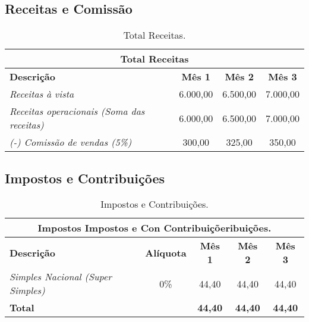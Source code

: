        
        
        \subsection{Receitas e Comissão}
		
		\begin{table}[htbp]
			\centering
			\caption{Total Receitas.}
			
			
			\begin{tabularx}{\linewidth}{|X|c|c|c|}
				\toprule
				\multicolumn{4}{c}{\cellcolor{gray!50}\textbf{Total Receitas}} \\
				\midrule
				\textbf{Descrição} & \textbf{Mês 1} & \textbf{Mês 2} & \textbf{Mês 3} \\
				\midrule
				\textit{Receitas à vista}			&	6.000,00	& 6.500,00 & 7.000,00 \\
				\textit{Receitas operacionais (Soma das receitas)}	&	6.000,00	& 6.500,00 & 7.000,00 \\
				\textit{(-) Comissão de vendas (5\%)}	&	300,00	& 325,00 & 350,00 \\
				\bottomrule
			\end{tabularx}
			
			
			\label{tab:receitasEComissoes}%
		\end{table}%
		
        
        
        \subsection{Impostos e Contribuições}
		
		\begin{table}[htbp]
			\centering
			\caption{Impostos e Contribuições.}
			
			
				\begin{tabularx}{\linewidth}{|X|c|c|c|c|}
					\toprule
					\multicolumn{5}{c}{\cellcolor{gray!50}\textbf{Impostos Impostos e Con Contribuiçõeribuições.}} \\
					\midrule
					\textbf{Descrição} & \textbf{Alíquota} & \textbf{Mês 1} & \textbf{Mês 2} & \textbf{Mês 3} \\
					\midrule
					\textit{Simples Nacional (Super Simples)}&	0\%		& 44,40 	& 44,40 & 44,40 \\
					\midrule
					\textbf{Total}			&	~	& \textbf{44,40} 	& \textbf{44,40} & \textbf{44,40} \\
					\bottomrule
				\end{tabularx}
			
			
			\label{tab:inpostosEContribuicoes}%
		\end{table}%
		
